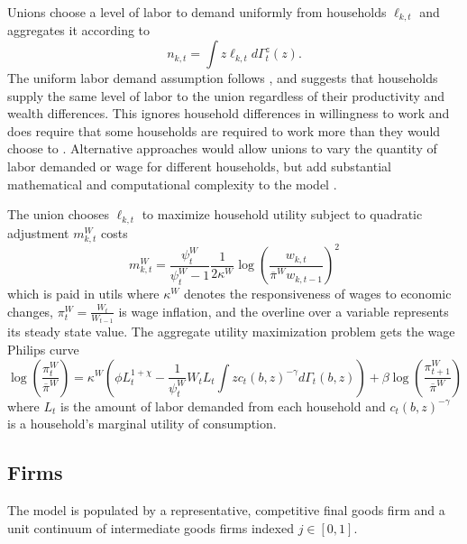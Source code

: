 Unions choose a level of labor to demand uniformly from households $\ell_{k, t}$ and aggregates it according to
\begin{equation*}
    n_{k, t} = \int z \ell_{k, t} d \Gamma_t^z (z).
\end{equation*}
The uniform labor demand assumption follows \textcite{auclert2023mpcs}, and suggests that households supply the same level of labor to the union regardless of their productivity and wealth differences. This ignores household differences in willingness to work and does require that some households are required to work more than they would choose to \autocite{gerke2024household}. Alternative approaches would allow unions to vary the quantity of labor demanded or wage for different households, but add substantial mathematical and computational complexity to the model \autocite{gerke2024household}.

The union chooses $\ell_{k, t}$ to maximize household utility subject to quadratic adjustment $m_{k, t}^W$ costs
\begin{equation*}
    m_{k, t}^W = \frac{\psi_t^W}{\psi_t^W - 1} \frac{1}{2 \kappa^W} \log\left(\frac{w_{k, t}}{\overline{\pi}^W w_{k, t-1}}\right)^2
\end{equation*}
which is paid in utils where $\kappa^W$ denotes the responsiveness of wages to economic changes, $\pi_t^W = \frac{W_t}{W_{t-1}}$ is wage inflation, and the overline over a variable represents its steady state value. The aggregate utility maximization problem gets the wage Philips curve
\begin{equation*}
    \log\left(\frac{\pi_t^W}{\overline{\pi}^W}\right) = \kappa^W \left( \phi L_t^{1 + \chi} - \frac{1}{\psi_t^W} W_t L_t \int z c_t(b, z)^{-\gamma} d\Gamma_t(b, z)\right) + \beta \log\left(\frac{\pi_{t+1}^W}{\overline{\pi}^W}\right)
\end{equation*}
where $L_t$ is the amount of labor demanded from each household and $c_t(b, z)^{-\gamma}$ is a household's marginal utility of consumption.


\subsection{Firms} \label{subsec:firms}

The model is populated by a representative, competitive final goods firm and a unit continuum of intermediate goods firms indexed $j \in [0, 1]$.

